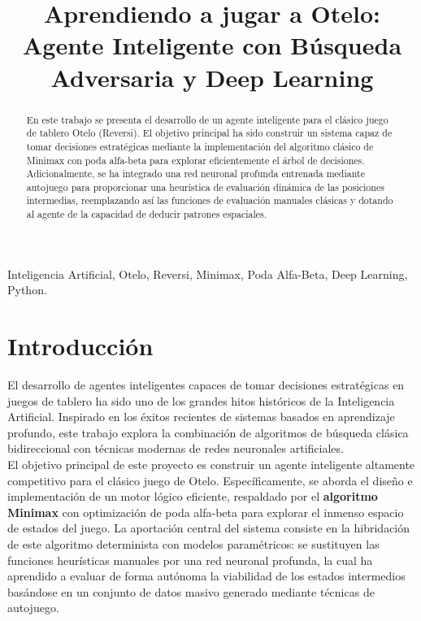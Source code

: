 \documentclass[conference]{IEEEtran}
\begin{document}
\title{Aprendiendo a jugar a Otelo: Agente Inteligente con Búsqueda Adversaria y Deep Learning}

\author{
}

\maketitle
\thispagestyle{plain} 
\pagestyle{plain}

\begin{abstract}
En este trabajo se presenta el desarrollo de un agente inteligente para el clásico juego de tablero Otelo (Reversi). El objetivo principal 
ha sido construir un sistema capaz de tomar decisiones estratégicas mediante la implementación del algoritmo clásico de Minimax con poda 
alfa-beta para explorar eficientemente el árbol de decisiones. Adicionalmente, se ha integrado una red neuronal profunda entrenada mediante 
autojuego para proporcionar una heurística de evaluación dinámica de las posiciones intermedias, reemplazando así las funciones de evaluación 
manuales clásicas y dotando al agente de la capacidad de deducir patrones espaciales.
\end{abstract}

\begin{IEEEkeywords}
Inteligencia Artificial, Otelo, Reversi, Minimax, Poda Alfa-Beta, Deep Learning, Python.
\end{IEEEkeywords}

\section{Introducción}
El desarrollo de agentes inteligentes capaces de tomar decisiones estratégicas en juegos de tablero ha sido uno de los grandes hitos históricos 
de la Inteligencia Artificial. Inspirado en los éxitos recientes de sistemas basados en aprendizaje profundo, este trabajo explora la combinación 
de algoritmos de búsqueda clásica bidireccional con técnicas modernas de redes neuronales artificiales.\\

El objetivo principal de este proyecto es construir un agente inteligente altamente competitivo para el clásico juego de Otelo. 
Específicamente, se aborda el diseño e implementación de un motor lógico eficiente, respaldado por el \textbf{algoritmo Minimax} con optimización de poda alfa-beta 
para explorar el inmenso espacio de estados del juego. La aportación central del sistema consiste en la hibridación de este algoritmo determinista con 
modelos paramétricos: se sustituyen las funciones heurísticas manuales por una red neuronal profunda, la cual ha aprendido a evaluar de forma autónoma 
la viabilidad de los estados intermedios basándose en un conjunto de datos masivo generado mediante técnicas de autojuego.\\
\end{document}
